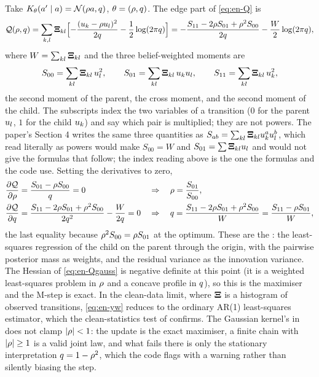Take $K_{\theta}(a'\mid a)=\mathcal{N}\!\left(\rho a,q\right)$, $\theta=(\rho,q)$. The edge part
of \cref{eq:en-Q} is
\begin{equation}
  \mathcal{Q}(\rho,q)=\sum_{k,l}\mathbf{\Xi}_{kl}\Bigl[-\frac{(u_{k}-\rho u_{l})^2}{2q}-\frac12\log(2\pi q)\Bigr]
  =-\frac{S_{11}-2\rho S_{01}+\rho^2S_{00}}{2q}-\frac{W}{2}\log(2\pi q),
  \label{eq:en-Qgauss}
\end{equation}
where $W=\sum_{kl}\mathbf{\Xi}_{kl}$ and the three belief-weighted moments are
\[
  S_{00}=\sum_{kl}\mathbf{\Xi}_{kl}\,u_{l}^2,\qquad
  S_{01}=\sum_{kl}\mathbf{\Xi}_{kl}\,u_{k}u_{l},\qquad
  S_{11}=\sum_{kl}\mathbf{\Xi}_{kl}\,u_{k}^2,
\]
the second moment of the parent, the cross moment, and the second moment of the child.
The subscripts index the two variables of a transition ($0$ for the parent
$u_{l}$, $1$ for the child $u_{k}$) and say which pair is multiplied; they are
not powers. The paper's Section 4 writes the same three quantities as
$S_{ab}=\sum_{kl}\mathbf{\Xi}_{kl}u_{k}^au_{l}^b$, which read literally as powers would
make $S_{00}=W$ and $S_{01}=\sum\mathbf{\Xi}_{kl}u_{l}$ and would not give the formulas that
follow; the index reading above is the one the formulas and the code use.
Setting the derivatives to zero,
\begin{equation}
\begin{aligned}
  \frac{\partial\mathcal{Q}}{\partial\rho}&=\frac{S_{01}-\rho S_{00}}{q}=0
  &&\Rightarrow\quad \rho=\frac{S_{01}}{S_{00}},\\
  \frac{\partial\mathcal{Q}}{\partial q}&=\frac{S_{11}-2\rho S_{01}+\rho^2S_{00}}{2q^2}-\frac{W}{2q}=0
  &&\Rightarrow\quad q=\frac{S_{11}-2\rho S_{01}+\rho^2S_{00}}{W}=\frac{S_{11}-\rho S_{01}}{W},
\end{aligned}
  \label{eq:en-yw}
\end{equation}
the last equality because $\rho^2S_{00}=\rho S_{01}$ at the optimum. These are the
: the least-squares regression of the
child on the parent through the origin, with the pairwise posterior mass as weights,
and the residual variance as the innovation variance. The Hessian of
\cref{eq:en-Qgauss} is negative definite at this point (it is a weighted least-squares
problem in $\rho$ and a concave profile in $q$), so this is the maximiser and the
M-step is exact. In the clean-data limit, where $\mathbf{\Xi}$ is a histogram of observed
transitions, \cref{eq:en-yw} reduces to the ordinary AR(1) least-squares estimator,
which the clean-statistics test of  confirms. The Gaussian
kernel's  in  does not clamp
$|\rho|<1$: the update is the exact maximiser, a finite chain with $|\rho|\ge1$ is a
valid joint law, and what fails there is only the stationary interpretation
$q=1-\rho^2$, which the code flags with a warning rather than silently biasing the
step.

